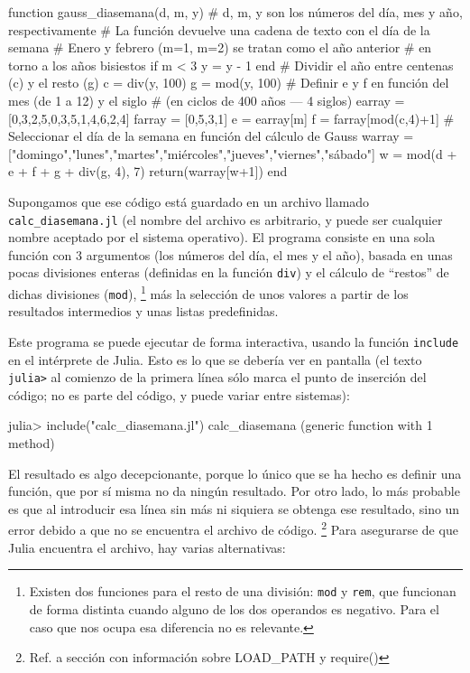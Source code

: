 ﻿\documentclass{article}
\newcommand{\code}{\texttt}
\begin{document}
\begin{juliacode}
function gauss_diasemana(d, m, y)
# d, m, y son los números del día, mes y año, respectivamente
# La función devuelve una cadena de texto con el día de la semana
  # Enero y febrero (m=1, m=2) se tratan como el año anterior
  # en torno a los años bisiestos
  if m < 3
    y = y - 1
  end
  # Dividir el año entre centenas (c) y el resto (g)
  c = div(y, 100)
  g = mod(y, 100)
  # Definir e y f en función del mes (de 1 a 12) y el siglo
  # (en ciclos de 400 años --- 4 siglos)
  earray = [0,3,2,5,0,3,5,1,4,6,2,4]
  farray = [0,5,3,1]
  e = earray[m]
  f = farray[mod(c,4)+1]
  # Seleccionar el día de la semana en función del cálculo de Gauss
  warray = ["domingo","lunes","martes","miércoles","jueves","viernes","sábado"]
  w = mod(d + e + f + g + div(g, 4), 7)
  return(warray[w+1])
end
\end{juliacode}

Supongamos que ese código está guardado en un archivo llamado \texttt{calc_diasemana.jl} (el nombre del archivo es arbitrario, y puede ser cualquier nombre aceptado por el sistema operativo). El programa consiste en una sola función con 3 argumentos (los números del día, el mes y el año), basada en unas pocas divisiones enteras (definidas en la función \code{div}) y el cálculo de ``restos'' de dichas divisiones (\code{mod}),%
\footnote{%
Existen dos funciones para el resto de una división: \code{mod} y \code{rem}, que funcionan de forma distinta cuando alguno de los dos operandos es negativo. Para el caso que nos ocupa esa diferencia no es relevante.%
}
más la selección de unos valores a partir de los resultados intermedios y unas listas predefinidas.

Este programa se puede ejecutar de forma interactiva, usando la función \code{include} en el intérprete de Julia. Esto es lo que se debería ver en pantalla (el texto \code{julia>} al comienzo de la primera línea sólo marca el punto de inserción del código; no es parte del código, y puede variar entre sistemas):

julia> include("calc_diasemana.jl")
calc_diasemana (generic function with 1 method)

El resultado es algo decepcionante, porque lo único que se ha hecho es definir una función, que por sí misma no da ningún resultado. Por otro lado, lo más probable es que al introducir esa línea sin más ni siquiera se obtenga ese resultado, sino un error debido a que no se encuentra el archivo de código.%
\footnote{%
Ref. a sección con información sobre LOAD\_PATH y require()%
}
Para asegurarse de que Julia encuentra el archivo,
hay varias alternativas:
\end{document}
